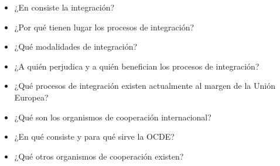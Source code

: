\documentclass{nuevotema}
\begin{document}
\ideaclave


\begin{itemize}
	\item ¿En consiste la integración?
	\item ¿Por qué tienen lugar los procesos de integración?
	\item ¿Qué modalidades de integración?
	\item ¿A quién perjudica y a quién benefician los procesos de integración?
	\item ¿Qué procesos de integración existen actualmente al margen de la Unión Europea?
	\item ¿Qué son los organismos de cooperación internacional?
	\item ¿En qué consiste y para qué sirve la OCDE?
	\item ¿Qué otros organismos de cooperación existen?
\end{itemize}

\esquemacorto
\end{document}
